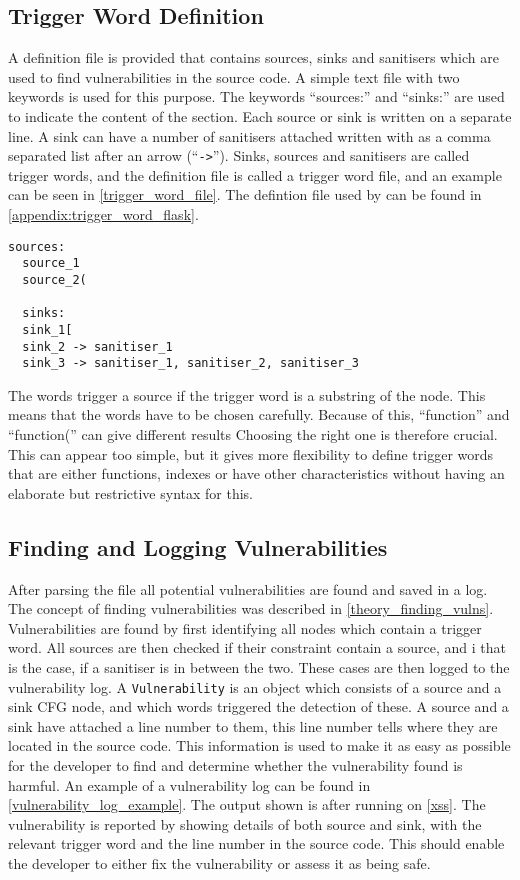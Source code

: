 \subsection{Trigger Word Definition}
A definition file is provided that contains sources, sinks and sanitisers which are used to find vulnerabilities in the source code.
A simple text file with two keywords  is used for this purpose.
The keywords ``sources:'' and ``sinks:'' are used to indicate the content of the section.
Each source or sink is written on a separate line.
A sink can have a number of sanitisers attached written with as a comma separated list after an arrow (``\texttt{->}'').
Sinks, sources and sanitisers are called trigger words, and the definition file is called a trigger word file, and an example can be seen in \cref{trigger_word_file}.
The defintion file used by \pyt{} can be found in \cref{appendix:trigger_word_flask}.
\begin{lstlisting}[style=default, caption={How the trigger word file should be defined.}, label={trigger_word_file}]
  sources:
  source_1
  source_2(

  sinks:
  sink_1[
  sink_2 -> sanitiser_1
  sink_3 -> sanitiser_1, sanitiser_2, sanitiser_3
\end{lstlisting}

The words trigger a source if the trigger word is a substring of the node.
This means that the words have to be chosen carefully.
Because of this, ``function'' and ``function('' can give different results
Choosing the right one is therefore crucial.
This can appear too simple, but it gives more flexibility to define trigger words that are either functions, indexes or have other characteristics without having an elaborate but restrictive syntax for this.

\subsection{Finding and Logging Vulnerabilities}
After parsing the file all potential vulnerabilities are found and saved in a log.
The concept of finding vulnerabilities was described in \cref{theory_finding_vulns}.
Vulnerabilities are found by first identifying all nodes which contain a trigger word.
All sources are then checked if their constraint contain a source, and i that is the case, if a sanitiser is in between the two.
These cases are then logged to the vulnerability log.
A \texttt{Vulnerability} is an object which consists of a source and a sink CFG node, and which words triggered the detection of these.
A source and a sink have attached a line number to them, this line number tells where they are located in the source code.
This information is used to make it as easy as possible for the developer to find and determine whether the vulnerability found is harmful.
An example of a vulnerability log can be found in \cref{vulnerability_log_example}.
The output shown is after running \pyt{} on \cref{xss}.
The vulnerability is reported by showing details of both source and sink, with the relevant trigger word and the line number in the source code.
This should enable the developer to either fix the vulnerability or assess it as being safe.

